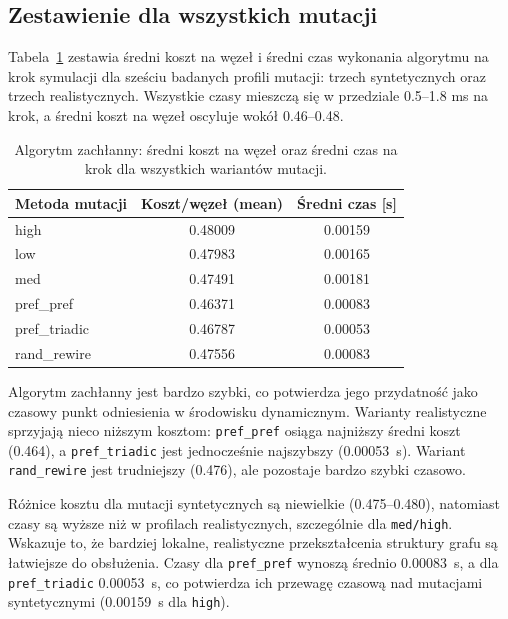 \subsection{Zestawienie dla wszystkich mutacji}
Tabela~\ref{tab:greedy-cold-summary} zestawia średni koszt na węzeł i średni czas wykonania algorytmu na krok symulacji dla sześciu badanych profili mutacji: trzech syntetycznych oraz trzech realistycznych. Wszystkie czasy mieszczą się w przedziale 0.5--1.8 ms na krok, a średni koszt na węzeł oscyluje wokół 0.46--0.48.

\begin{table}[H]
  \centering
  \caption{Algorytm zachłanny: średni koszt na węzeł oraz średni czas na krok dla wszystkich wariantów mutacji.}
  \label{tab:greedy-cold-summary}
  \begin{tabular}{lcc}
    \toprule
    \textbf{Metoda mutacji} & \textbf{Koszt/węzeł (mean)} & \textbf{Średni czas [s]} \\
    \midrule
    high                    & 0.48009                     & 0.00159                  \\
    low                     & 0.47983                     & 0.00165                  \\
    med                     & 0.47491                     & 0.00181                  \\
    pref\_pref              & 0.46371                     & 0.00083                  \\
    pref\_triadic           & 0.46787                     & 0.00053                  \\
    rand\_rewire            & 0.47556                     & 0.00083                  \\
    \bottomrule
  \end{tabular}
\end{table}

Algorytm zachłanny jest bardzo szybki, co potwierdza jego przydatność jako czasowy punkt odniesienia w środowisku dynamicznym. Warianty realistyczne sprzyjają nieco niższym kosztom: \texttt{pref\_pref} osiąga najniższy średni koszt (0.464), a \texttt{pref\_triadic} jest jednocześnie najszybszy (\SI{0.00053}{\s}). Wariant \texttt{rand\_rewire} jest trudniejszy (0.476), ale pozostaje bardzo szybki czasowo.

Różnice kosztu dla mutacji syntetycznych są niewielkie (0.475--0.480), natomiast czasy są wyższe niż w profilach realistycznych, szczególnie dla \texttt{med/high}. Wskazuje to, że bardziej lokalne, realistyczne przekształcenia struktury grafu są łatwiejsze do obsłużenia. Czasy dla \texttt{pref\_pref} wynoszą średnio \SI{0.00083}{\s}, a dla \texttt{pref\_triadic} \SI{0.00053}{\s}, co potwierdza ich przewagę czasową nad mutacjami syntetycznymi (\SI{0.00159}{\s} dla \texttt{high}).


